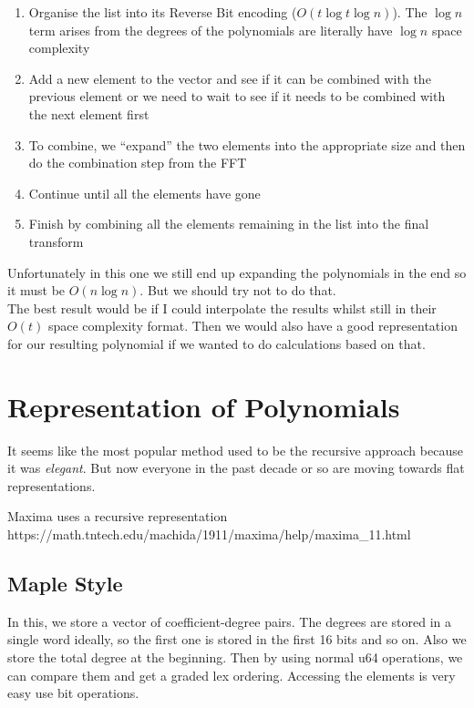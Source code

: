 \begin{enumerate}[1.]
    \item Organise the list into its Reverse Bit encoding ($O(t \log t \log n)$). The $\log n$ term arises from the degrees of the polynomials are literally have $\log n$ space complexity
    \item Add a new element to the vector and see if it can be combined with the previous element or we need to wait to see if it needs to be combined with the next element first
    \item To combine, we ``expand'' the two elements into the appropriate size and then do the combination step from the FFT
    \item Continue until all the elements have gone
    \item Finish by combining all the elements remaining in the list into the final transform
\end{enumerate}

Unfortunately in this one we still end up expanding the polynomials in the end so it must be $O(n\log n)$. But we should try not to do that.\\
The best result would be if I could interpolate the results whilst still in their $O(t)$ space complexity format. Then we would also have a good representation for our resulting polynomial if we wanted to do calculations based on that.

\section{Representation of Polynomials}

It seems like the most popular method used to be the recursive approach because it was \emph{elegant}. But now everyone in the past decade or so are moving towards flat representations.

Maxima uses a recursive representation https://math.tntech.edu/machida/1911/maxima/help/maxima\_11.html

\subsection{Maple Style}%
\label{sub:Maple Style}

In this, we store a vector of coefficient-degree pairs. The degrees are stored in a single word ideally, so the first one is stored in the first 16 bits and so on. Also we store the total degree at the beginning. Then by using normal u64 operations, we can compare them and get a graded lex ordering. Accessing the elements is very easy use bit operations.

